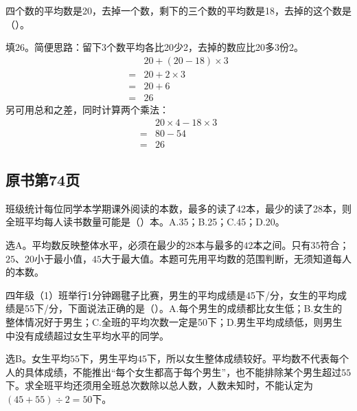 四个数的平均数是20，去掉一个数，剩下的三个数的平均数是18，去掉的这个数是（\hspace{1.8em}）。\par
\begin{BookAnswer}
填\(26\)。简便思路：留下3个数平均各比20少2，去掉的数应比20多3份2。\[\begin{aligned}&20+(20-18)\times3\\={}&20+2\times3\\={}&20+6\\={}&26\end{aligned}\]另可用总和之差，同时计算两个乘法：\[\begin{aligned}&20\times4-18\times3\\={}&80-54\\={}&26\end{aligned}\]
\end{BookAnswer}



\subsection*{原书第74页}

班级统计每位同学本学期课外阅读的本数，最多的读了42本，最少的读了28本，则全班平均每人读书数量可能是（\hspace{1.8em}）本。A.35；B.25；C.45；D.20。\par
\begin{BookAnswer}
选A。平均数反映整体水平，必须在最少的\(28\)本与最多的\(42\)本之间。只有\(35\)符合；\allowbreak{}\(25\)、\(20\)小于最小值，\allowbreak{}\(45\)大于最大值。本题可先用平均数的范围判断，无须知道每人的本数。
\end{BookAnswer}

四年级（1）班举行1分钟踢毽子比赛，男生的平均成绩是45下/分，女生的平均成绩是55下/分，下面说法正确的是（\hspace{1.8em}）。A.每个男生的成绩都比女生低；B.女生的整体情况好于男生；C.全班的平均次数一定是50下；D.男生平均成绩低，则男生中没有成绩超过女生平均水平的同学。\par
\begin{BookAnswer}
选B。女生平均\(55\)下，男生平均\(45\)下，所以女生整体成绩较好。平均数不代表每个人的具体成绩，不能推出“每个女生都高于每个男生”，也不能排除某个男生超过\(55\)下。求全班平均还须用全班总次数除以总人数，人数未知时，不能认定为\((45+55)\div2=50\)下。
\end{BookAnswer}

